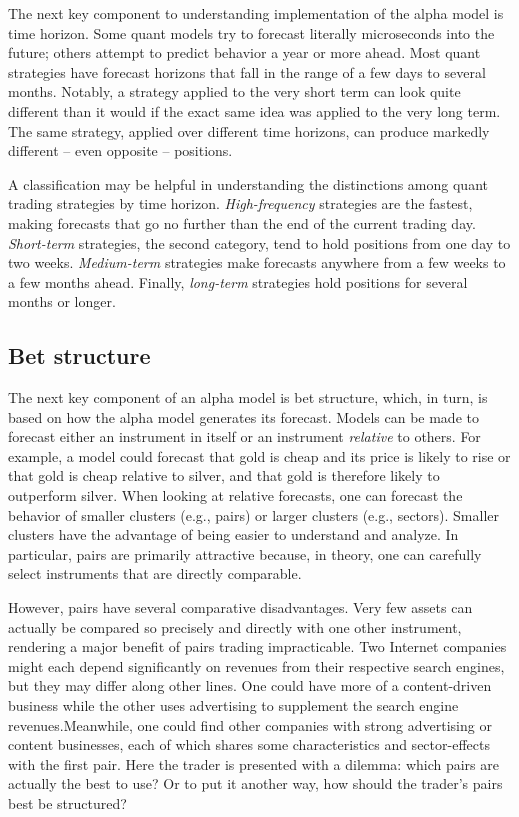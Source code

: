 \documentclass[11pt]{report}
\begin{document}
				The next key component to understanding implementation of the alpha model is time horizon. Some quant models try to forecast literally microseconds into the future; others attempt to predict behavior a year or more ahead. Most quant strategies have forecast horizons that fall in the range of a few days to several months. Notably, a strategy applied to the very short term can look quite different than it would if the exact same idea was applied to the very long term. The same strategy, applied over different time horizons, can produce markedly different -- even opposite -- positions.

				A classification may be helpful in understanding the distinctions among quant trading strategies by time horizon. \textit{High-frequency} strategies are the fastest, making forecasts that go no further than the end of the current trading day. \textit{Short-term} strategies, the second category, tend to hold positions from one day to two weeks. \textit{Medium-term} strategies make forecasts anywhere from a few weeks to a few months ahead. Finally, \textit{long-term} strategies hold positions for several months or longer.

			\subsection{Bet structure}

				The next key component of an alpha model is bet structure, which, in turn, is based on how the alpha model generates its forecast. Models can be made to forecast either an instrument in itself or an instrument \textit{relative} to others. For example, a model could forecast that gold is cheap and its price is likely to rise or that gold is cheap relative to silver, and that gold is therefore likely to outperform silver. When looking at relative forecasts, one can forecast the behavior of smaller clusters (e.g., pairs) or larger clusters (e.g., sectors). Smaller clusters have the advantage of being easier to understand and analyze. In particular, pairs are primarily attractive because, in theory, one can carefully select instruments that are directly comparable.

				However, pairs have several comparative disadvantages. Very few assets can actually be compared so precisely and directly with one other instrument, rendering a major benefit of pairs trading impracticable. Two Internet companies might each depend significantly on revenues from their respective search engines, but they may differ along other lines. One could have more of a content-driven business while the other uses advertising to supplement the search engine revenues.Meanwhile, one could find other companies with strong advertising or content businesses, each of which shares some characteristics and sector-effects with the first pair. Here the trader is presented with a dilemma: which pairs are actually the best to use? Or to put it another way, how should the trader's pairs best be structured?
\end{document}
